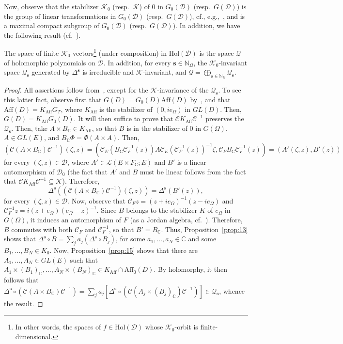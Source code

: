 \documentclass[10.5pt,reqno]{amsart}
\newcommand{\Aff}{\mathrm{Aff}}
\newcommand{\Hol}{\mathrm{Hol}}
\newcommand{\vect}[1]{\mathbf{{#1}}}
\newcommand{\N}{\mathds{N}}
\newcommand{\C}{\mathds{C}}
\newcommand{\Cc}{\mathcal{C}}
\newcommand{\Dc}{\mathcal{D}}
\newcommand{\Kc}{\mathcal{K}}
\newcommand{\Qc}{\mathcal{Q}}
\newcommand{\Lin}{\mathscr{L}}
\begin{document}
Now, observe that the stabilizer $\Kc_0$ (resp.\ $\Kc$) of $0$ in $G_0(\Dc)$ (resp.\ $G(\Dc)$) is the group of linear transformations in $G_0(\Dc)$ (resp.\ $G(\Dc)$), cf., e.g.,~\cite[1.5]{Loos}, and is a maximal compact subgroup of $G_0(\Dc)$  (resp.\ $G(\Dc)$). In addition, we have the following result (cf.~\cite[Theorem 2.1]{FarautKoranyi2}).

\begin{prop}\label{prop:30}
	The space of finite $\Kc_0$-vectors\footnote{In other words, the spaces of $f\in \Hol(\Dc)$ whose $\Kc_0$-orbit is finite-dimensional.} (under composition) in $\Hol(\Dc)$ is the space $\Qc$ of holomorphic polynomials on $\Dc$. In addition, for every $\vect s\in \N_\Omega$, the $\Kc_0$-invariant space $\Qc_{\vect s}$ generated by $\Delta^{\vect s}$ is irreducible and $\Kc$-invariant, and  $\Qc=\bigoplus_{\vect s\in \N_\Omega} \Qc_{\vect s}$. 
\end{prop}

\begin{proof}
	All assertions follow from~\cite[Theorem 2.1]{FarautKoranyi2}, except for the $\Kc$-invariance of the $\Qc_{\vect s}$. To see this latter fact, observe first that $G(D)= G_0(D)\Aff(D)$ by~\cite[Remark 1]{Nakajima}, and that $\Aff(D)=K_\Aff G_T$, where $K_\Aff$ is the stabilizer of $(0,i e_\Omega)$ in $GL(D)$. Then, $G(D)=K_\Aff G_0(D)$. It will then suffice to prove that  $\Cc K_\Aff\Cc^{-1}$ preserves the $\Qc_{\vect s}$. Then, take $A\times B_\C\in K_\Aff$, so that $B$ is in the stabilizer of $0$ in $G(\Omega)$, $A\in GL(E)$, and $B_\C\Phi=\Phi(A\times A)$. Then,
	\[
	(\Cc(A\times B_\C )\Cc^{-1})(\zeta,z)=(\Cc_E( B_\C \Cc_F^{-1}(z)) A \Cc_E(\Cc_F^{-1}(z))^{-1}\zeta,   \Cc_F B_\C \Cc_F^{-1}(z))=(A'(\zeta,z),B'(z))
	\]
	for every $(\zeta,z)\in \Dc$, where $A'\in \Lin(E\times F_\C;E)$ and $B'$ is a linear automorphism of $\Dc_0$ (the fact that $A'$ and $B$ must be linear follows from the fact that $\Cc K_\Aff\Cc^{-1}\subseteq \Kc$). Therefore,
	\[
	\Delta^{\vect s}((\Cc(A\times B_\C )\Cc^{-1})(\zeta,z))=\Delta^{\vect s}(B'(z)),
	\]
	for every $(\zeta,z)\in \Dc$.  Now, observe that $\Cc_F z= (z+i e_\Omega)^{-1}(z-i e_\Omega)$ and $\Cc_F^{-1}z=i (z+e_\Omega)(e_\Omega-z)^{-1}$. Since $B$ belongs to the stabilizer $K$ of $e_\Omega$ in $G(\Omega)$, it induces an automorphism of $F$ (as a Jordan algebra, cf.~\cite[p.~56--57]{FarautKoranyi}). Therefore, $B$ commutes with both $\Cc_F$ and $\Cc^{-1}_F$, so that $B'=B_\C$. 
	Thus,  Proposition~\ref{prop:13} shows that $\Delta^{\vect s}\circ B=\sum_j a_j (\Delta^{\vect s}\circ B_j)$, for some  $a_1,\dots, a_N\in\C$ and some $B_1,\dots, B_N\in K_0$.
	Now, Proposition~\ref{prop:15} shows that there are $A_1,\dots, A_N\in GL(E)$ such that $A_1\times (B_1)_\C,\dots, A_N\times (B_N)_\C\in  K_\Aff\cap \Aff_0(D)$. By holomorphy, it then follows that $\Delta^{\vect s}\circ (\Cc(A\times B_\C )\Cc^{-1})=\sum_j a_j  [\Delta^{\vect s}\circ (\Cc(A_j\times (B_j)_\C )\Cc^{-1})]\in \Qc_{\vect s}$, whence the result.
\end{proof}
\end{document}
